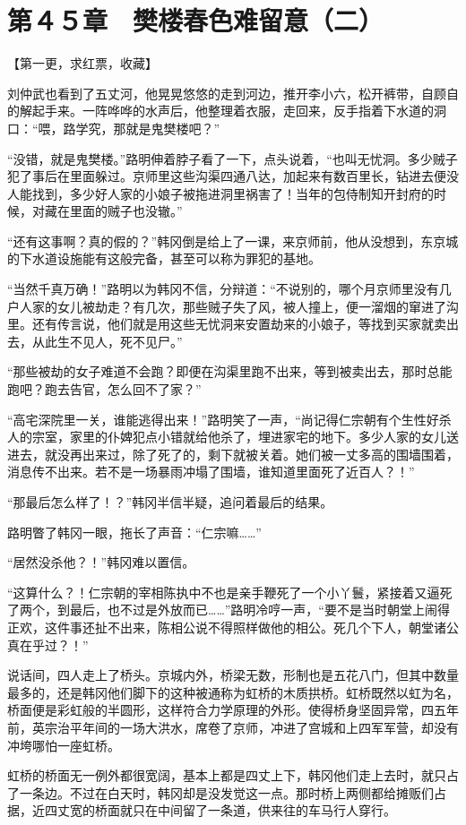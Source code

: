 \section{第４５章　樊楼春色难留意（二）}

【第一更，求红票，收藏】

刘仲武也看到了五丈河，他晃晃悠悠的走到河边，推开李小六，松开裤带，自顾自的解起手来。一阵哗哗的水声后，他整理着衣服，走回来，反手指着下水道的洞口：“喂，路学究，那就是鬼樊楼吧？”

“没错，就是鬼樊楼。”路明伸着脖子看了一下，点头说着，“也叫无忧洞。多少贼子犯了事后在里面躲过。京师里这些沟渠四通八达，加起来有数百里长，钻进去便没人能找到，多少好人家的小娘子被拖进洞里祸害了！当年的包侍制知开封府的时候，对藏在里面的贼子也没辙。”

“还有这事啊？真的假的？”韩冈倒是给上了一课，来京师前，他从没想到，东京城的下水道设施能有这般完备，甚至可以称为罪犯的基地。

“当然千真万确！”路明以为韩冈不信，分辩道：“不说别的，哪个月京师里没有几户人家的女儿被劫走？有几次，那些贼子失了风，被人撞上，便一溜烟的窜进了沟里。还有传言说，他们就是用这些无忧洞来安置劫来的小娘子，等找到买家就卖出去，从此生不见人，死不见尸。”

“那些被劫的女子难道不会跑？即便在沟渠里跑不出来，等到被卖出去，那时总能跑吧？跑去告官，怎么回不了家？”

“高宅深院里一关，谁能逃得出来！”路明笑了一声，“尚记得仁宗朝有个生性好杀人的宗室，家里的仆婢犯点小错就给他杀了，埋进家宅的地下。多少人家的女儿送进去，就没再出来过，除了死了的，剩下就被关着。她们被一丈多高的围墙围着，消息传不出来。若不是一场暴雨冲塌了围墙，谁知道里面死了近百人？！”

“那最后怎么样了！？”韩冈半信半疑，追问着最后的结果。

路明瞥了韩冈一眼，拖长了声音：“仁宗嘛……”

“居然没杀他？！”韩冈难以置信。

“这算什么？！仁宗朝的宰相陈执中不也是亲手鞭死了一个小丫鬟，紧接着又逼死了两个，到最后，也不过是外放而已……”路明冷哼一声，“要不是当时朝堂上闹得正欢，这件事还扯不出来，陈相公说不得照样做他的相公。死几个下人，朝堂诸公真在乎过？！”

说话间，四人走上了桥头。京城内外，桥梁无数，形制也是五花八门，但其中数量最多的，还是韩冈他们脚下的这种被通称为虹桥的木质拱桥。虹桥既然以虹为名，桥面便是彩虹般的半圆形，这样符合力学原理的外形。使得桥身坚固异常，四五年前，英宗治平年间的一场大洪水，席卷了京师，冲进了宫城和上四军军营，却没有冲垮哪怕一座虹桥。

虹桥的桥面无一例外都很宽阔，基本上都是四丈上下，韩冈他们走上去时，就只占了一条边。不过在白天时，韩冈却是没发觉这一点。那时桥上两侧都给摊贩们占据，近四丈宽的桥面就只在中间留了一条道，供来往的车马行人穿行。

